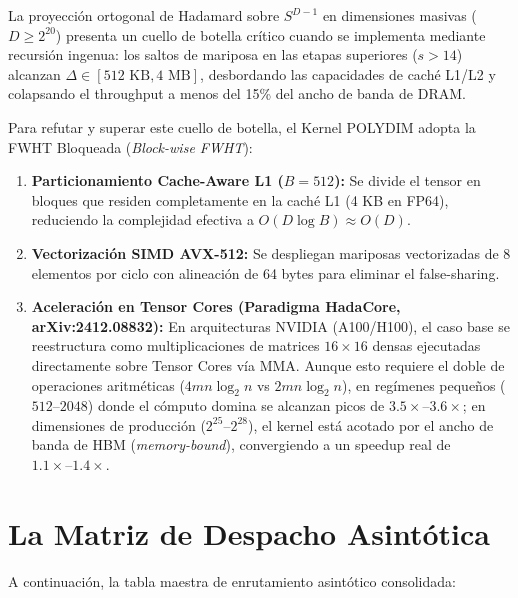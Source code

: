 La proyección ortogonal de Hadamard sobre $S^{D-1}$ en dimensiones masivas ($D \ge 2^{20}$) presenta un cuello de botella crítico cuando se implementa mediante recursión ingenua: los saltos de mariposa en las etapas superiores ($s > 14$) alcanzan $\Delta \in [512\text{ KB}, 4\text{ MB}]$, desbordando las capacidades de caché L1/L2 y colapsando el throughput a menos del 15\% del ancho de banda de DRAM.

Para refutar y superar este cuello de botella, el Kernel POLYDIM adopta la FWHT Bloqueada (\textit{Block-wise FWHT}):
\begin{enumerate}
    \item \textbf{Particionamiento Cache-Aware L1 ($B = 512$):} Se divide el tensor en bloques que residen completamente en la caché L1 (4 KB en FP64), reduciendo la complejidad efectiva a $O(D \log B) \approx O(D)$.
    \item \textbf{Vectorización SIMD AVX-512:} Se despliegan mariposas vectorizadas de 8 elementos por ciclo con alineación de 64 bytes para eliminar el false-sharing.
    \item \textbf{Aceleración en Tensor Cores (Paradigma HadaCore, arXiv:2412.08832):} En arquitecturas NVIDIA (A100/H100), el caso base se reestructura como multiplicaciones de matrices $16 \times 16$ densas ejecutadas directamente sobre Tensor Cores vía MMA. Aunque esto requiere el doble de operaciones aritméticas ($4mn \log_2 n$ vs $2mn \log_2 n$), en regímenes pequeños ($512\text{--}2048$) donde el cómputo domina se alcanzan picos de $3.5\times\text{--}3.6\times$; en dimensiones de producción ($2^{25}\text{--}2^{28}$), el kernel está acotado por el ancho de banda de HBM (\textit{memory-bound}), convergiendo a un speedup real de $1.1\times\text{--}1.4\times$.
\end{enumerate}

\section{La Matriz de Despacho Asintótica}
\label{sec:dispatch_matrix}

A continuación, la tabla maestra de enrutamiento asintótico consolidada:

